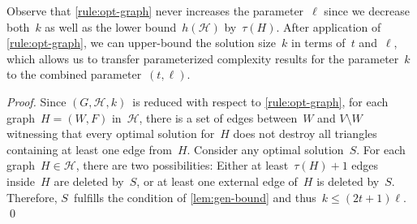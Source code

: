 \documentclass[envcountsame,numbook,smallextended]{svjour3}
\numberwithin{equation}{section}
\numberwithin{figure}{section}
\newcommand{\packing}{\ensuremath{\mathcal H}}
\newcommand{\TAGP}{\textsc{Triangle Deletion with  Cost-$t$ Packing}}
\begin{document}
\noindent Observe that \cref{rule:opt-graph} never increases the parameter~$\ell$ since we decrease both~$k$ as well as the lower bound~$h(\packing)$ by~$\tau(H)$.
After application of \cref{rule:opt-graph}, we can upper-bound
the solution size~$k$ in terms of~$t$ and~$\ell$, which allows us to transfer parameterized complexity results for the parameter~\(k\) to the combined parameter~\((t,\ell)\).
\begin{proof}
  Since $(G,\packing,k)$~is reduced with respect to \cref{rule:opt-graph}, for each graph~$H=(W,F)$ in~$\packing$, there is a set of edges between~$W$ and $V\setminus W$ witnessing that every optimal solution for~$H$ does not destroy all triangles containing at least one edge from~$H$.  Consider any optimal solution~$S$. For each graph~$H\in\mathcal H$, there are two possibilities: Either at least~$\tau(H)+1$ edges inside~$H$ are deleted by~$S$, or at least one external edge of~$H$ is deleted by~$S$.  Therefore, $S$~fulfills the condition of \cref{lem:gen-bound} and thus~$k\le (2t+1)\ell$.
\qed\end{proof}
\end{document}
